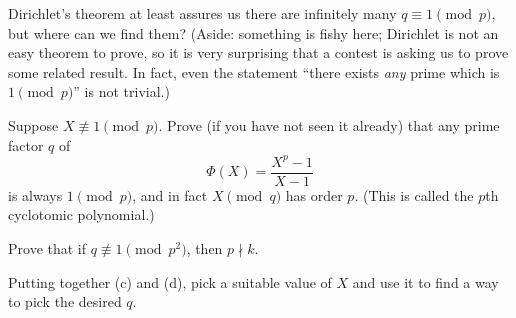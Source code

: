 Dirichlet's theorem at least assures us there
are infinitely many $q \equiv 1 \pmod p$,
but where can we find them?
(Aside: something is fishy here;
Dirichlet is not an easy theorem to prove,
so it is very surprising that a contest
is asking us to prove some related result.
In fact, even the statement ``there exists \emph{any} prime
which is $1 \pmod p$'' is not trivial.)
\begin{walk}[resume]
  \ii Suppose $X \not\equiv 1 \pmod p$.
  Prove (if you have not seen it already)
  that any prime factor $q$ of
  \[ \Phi(X) = \frac{X^p-1}{X-1} \]
  is always $1 \pmod p$, and in fact $X \pmod q$ has order $p$.
  (This is called the $p$th cyclotomic polynomial.)

  \ii Prove that if $q \not\equiv 1 \pmod{p^2}$,
  then $p \nmid k$.

  \ii Putting together (c) and (d),
  pick a suitable value of $X$
  and use it to find a way to pick the desired $q$.
\end{walk}
